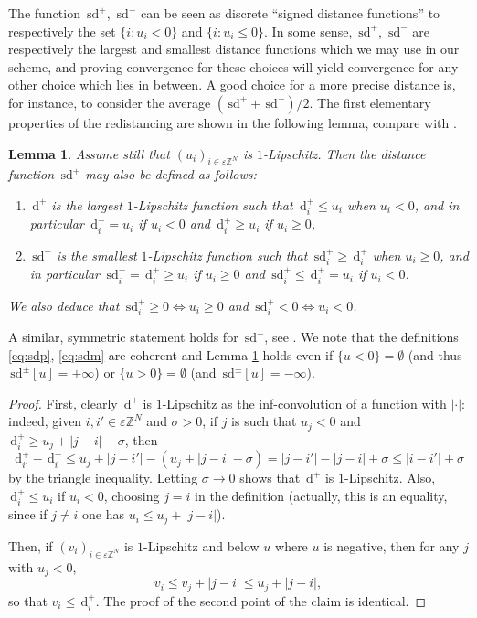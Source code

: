 \documentclass[10pt]{amsart}
\theoremstyle{plain}
\newtheorem{lemma}[theorem]{Lemma}
\theoremstyle{definition}
\newcommand{\Z}{\mathbb{Z}}
\newcommand{\e}{\varepsilon}
\newcommand{\ud}{\,\mathrm{d}}
\newcommand{\sd}{\,\mathrm{sd}}
\newcommand{\ez}{\e\Z^N}
\numberwithin{equation}{section}
\begin{document}
The function $\sd^+$, $\sd^-$ can be seen as discrete ``signed distance functions''
to respectively the set $\{i:u_i<0\}$ and $\{i:u_i\le 0\}$.
In some sense, $\sd^+$, $\sd^-$ are respectively the largest
and smallest distance functions which we may use in our
scheme, and proving convergence
for these choices will yield convergence for any other choice 
which lies in between. A good choice
for a more precise distance is, for instance, to consider the average $(\sd^++\sd^-)/2$.  {The first elementary properties of the redistancing are shown in the following lemma, compare with  \cite[Section 4]{CDGM-crystal}.}

\begin{lemma}\label{lem:defsd}
 {Assume still that $(u_i)_{i\in\ez}$ is $1$-Lipschitz. Then}
  the distance function $\sd^+$ may also be defined as follows:
  \begin{enumerate} 
  \item $\ud^+$ is the largest $1$-Lipschitz function such that $\ud^+_i\le u_i$ when
    $u_i<0$, and in particular $\ud^+_i=u_i$ if $u_i<0$ and $\ud^+_i\ge u_i$ if $u_i\ge 0$,
  \item $\sd^+$ is the smallest $1$-Lipschitz function such that $\sd^+_i\ge \ud^+_i$
    when $u_i\ge 0$, and in particular $\sd^+_i=\ud^+_i\ge u_i$ if $u_i\ge 0$ and $\sd^+_i\le \ud^+_i=u_i$
    if $u_i<0$.
  \end{enumerate}
  We also deduce that $\sd_i^+\ge 0\Leftrightarrow u_i\ge 0$ and
  $\sd_i^+< 0 \Leftrightarrow u_i<0$.
\end{lemma}
\noindent A similar, symmetric statement holds for $\sd^-$, see \cite{CDGM-crystal}.  {We note that the definitions \eqref{eq:sdp}, \eqref{eq:sdm} are coherent and Lemma \ref{lem:defsd} holds even if $\{u<0\}=\emptyset$ (and thus $\sd^\pm[u]=+\infty$) or $\{u>0\}=\emptyset$ (and $\sd^\pm[u]= -\infty$).}

\begin{proof}
  First, clearly $\ud^+$ is $1$-Lipschitz as the inf-convolution of a function
  with $|\cdot|$:  {indeed,} given $i,i'\in\ez$ and  {$\sigma>0$}, if $j$ is such that
  $u_j<0$ and $\ud^+_i\ge u_j+|j-i|- {\sigma}$,
  then
  \[
     {\ud^+_{i'}-\ud^+_i} \le  u_j+|j-i'| - (u_j+|j-i|- {\sigma}) = |j-i'|-|j-i|+ {\sigma}\le |i-i'|+ {\sigma}
  \]
  by the triangle inequality.   {Letting $\sigma\to 0$ shows that $\ud^+$ is $1$-Lipschitz.} Also,
  $\ud^+_i\le u_i$ if $u_i<0$, choosing $j=i$ in the definition (actually,
  this is an equality, since if $j\neq i$ one has $u_i \le u_j + |j-i|$).

  Then, if $(v_i)_{i\in\ez}$ is $1$-Lipschitz and below $u$ where $u$ is negative, then
  for any $j$ with $u_j<0$,
  \[
    v_i \le v_j+|j-i| \le u_j+|j-i|,
  \]
  so that $v_i\le \ud^+_i$.  
  The proof of the second point of the claim is identical.
\end{proof}
\end{document}
